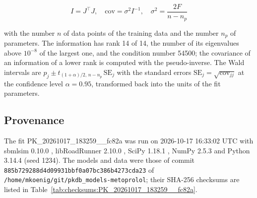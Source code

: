 \begin{equation}
I = J^\top J, \quad \mathrm{cov} = \sigma^2 I^{-1}, \quad \sigma^2 = \frac{2 F}{n - n_p}
\end{equation}

with the number $n$ of data points of the training data and the number $n_p$ of parameters. The information has rank 14 of 14, the number of its eigenvalues above $10^{-8}$ of the largest one, and the condition number 54500; the covariance of an information of a lower rank is computed with the pseudo-inverse. The Wald intervals are $\hat{p}_j \pm t_{(1+\alpha)/2,\, n-n_p}\, \mathrm{SE}_j$ with the standard errors $\mathrm{SE}_j = \sqrt{\mathrm{cov}_{jj}}$ at the confidence level $\alpha = 0.95$, transformed back into the units of the fit parameters.

\subsection{Provenance}

The fit PK\_20261017\_183259\_\_fc82a was run on 2026-10-17 16:33:02 UTC with sbmlsim 0.10.0 \cite{Koenig2026_sbmlsim}, libRoadRunner 2.10.0 \cite{Welsh2023}, SciPy 1.18.1 \cite{Virtanen2020}, NumPy 2.5.3 \cite{Harris2020} and Python 3.14.4 (seed 1234). The models and data were those of commit \texttt{885b729288d4d09931bbf0a07bc386b4273cda23} of \texttt{/home/mkoenig/git/pkdb\_models-metoprolol}; their SHA-256 checksums are listed in Table~\ref{tab:checksums:PK_20261017_183259__fc82a}.

